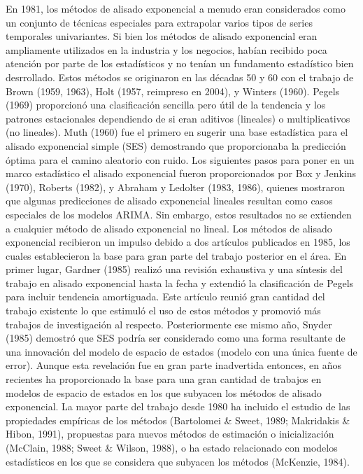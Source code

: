 \documentclass{llncs}
\begin{document}
En 1981, los métodos de alisado exponencial a menudo eran considerados como un conjunto de técnicas especiales para extrapolar varios tipos de series temporales univariantes. Si bien los métodos de alisado exponencial eran ampliamente utilizados en la industria y los negocios, habían recibido poca atención por parte de los estadísticos y no tenían un fundamento estadístico bien desrrollado. Estos métodos se originaron en las décadas 50 y 60 con el trabajo de Brown (1959, 1963), Holt (1957, reimpreso en 2004), y Winters (1960). Pegels (1969) proporcionó una clasificación sencilla pero útil de la tendencia y los patrones estacionales dependiendo de si eran aditivos (lineales)  o multiplicativos (no lineales).
Muth (1960) fue el primero en sugerir una base estadística para el alisado exponencial simple (SES) demostrando que proporcionaba la predicción óptima para el camino aleatorio con ruido. Los siguientes pasos para poner en un marco estadístico el alisado exponencial fueron proporcionados por Box y Jenkins (1970), Roberts (1982), y Abraham y Ledolter (1983, 1986), quienes mostraron que algunas predicciones de alisado exponencial lineales resultan como casos especiales de los modelos ARIMA. Sin embargo, estos resultados no se extienden a cualquier método de alisado exponencial no lineal.
Los métodos de alisado exponencial recibieron un impulso debido a dos artículos publicados en 1985, los cuales establecieron la base para gran parte del trabajo posterior en el área. En primer lugar, Gardner (1985) realizó una revisión exhaustiva y una síntesis del trabajo en alisado exponencial hasta la fecha y extendió la clasificación de Pegels para incluir  tendencia amortiguada. Este artículo reunió gran cantidad del trabajo existente lo que estimuló el uso de estos métodos y promovió más trabajos de investigación al respecto. Posteriormente ese mismo año, Snyder (1985) demostró que SES podría ser considerado como una forma resultante de una innovación del modelo de espacio de estados (modelo con una única fuente de error). Aunque esta revelación fue en gran parte inadvertida entonces, en años recientes ha proporcionado la base para una gran cantidad de trabajos en modelos de espacio de estados en los que subyacen  los métodos de alisado exponencial.
La mayor parte del trabajo desde 1980 ha incluido el estudio de las propiedades empíricas de los métodos (Bartolomei \& Sweet, 1989; Makridakis \& Hibon, 1991), propuestas para nuevos métodos de estimación o inicialización (McClain, 1988; Sweet \& Wilson, 1988), o ha estado relacionado con modelos estadísticos en los que se considera que subyacen los métodos (McKenzie, 1984). 
\end{document}
